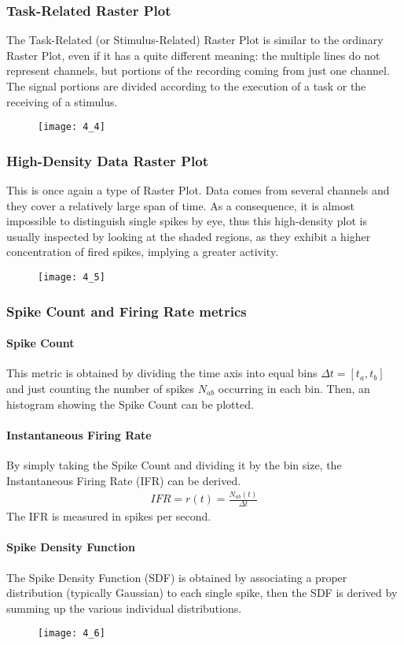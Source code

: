 \subsubsection{Task-Related Raster Plot}
The Task-Related (or Stimulus-Related) Raster Plot is similar to the ordinary Raster Plot, even if it
has a quite different meaning: the multiple lines do not represent channels, but portions of the
recording coming from just one channel. The signal portions are divided according to the execution of
a task or the receiving of a stimulus.
\begin{figure}[H]
    \texttt{[image: 4\_4]}
    \centering
\end{figure}
\subsubsection{High-Density Data Raster Plot}
This is once again a type of Raster Plot. Data comes from several channels and they cover a relatively
large span of time. As a consequence, it is almost impossible to distinguish single spikes by eye,
thus this high-density plot is usually inspected by looking at the shaded regions, as they exhibit a
higher concentration of fired spikes, implying a greater activity.
\begin{figure}[H]
    \texttt{[image: 4\_5]}
    \centering
\end{figure}
\subsubsection{Spike Count and Firing Rate metrics}
\paragraph{Spike Count}
This metric is obtained by dividing the time axis into equal bins \(\Delta{t}=[t_a,t_b]\) and just
counting the number of spikes \(N_{ab}\) occurring in each bin.
Then, an histogram showing the Spike Count can be plotted.
\paragraph{Instantaneous Firing Rate}
By simply taking the Spike Count and dividing it by the bin size, the Instantaneous Firing Rate (IFR)
can be derived. 
\begin{align*}
    IFR=r(t)=\frac{N_{ab}(t)}{\Delta{t}}
\end{align*}
The IFR is measured in spikes per second.
\paragraph{Spike Density Function}
The Spike Density Function (SDF) is obtained by associating a proper distribution (typically Gaussian)
to each single spike, then the SDF is derived by summing up the various individual distributions.
\begin{figure}[H]
    \texttt{[image: 4\_6]}
    \centering
\end{figure}
